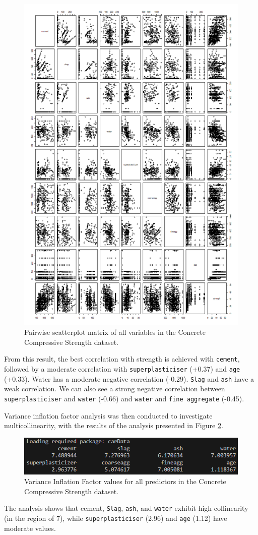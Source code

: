 \documentclass[]{article}
\begin{document}
\begin{figure}[H]
	\centering
	\includegraphics[width=0.5\linewidth]{img/img-pairwise-plot}
	\caption{Pairwise scatterplot matrix of all variables in the Concrete Compressive Strength dataset.}
	\label{fig:img-pairwise-plot}
\end{figure}


From this result, the best correlation with strength is achieved with \texttt{cement}, followed by a moderate correlation with \texttt{superplasticiser} (+0.37) and \texttt{age} (+0.33).
Water has a moderate negative correlation (-0.29). \texttt{Slag} and \texttt{ash} have a weak correlation. We can also see a strong negative correlation between \texttt{superplasticiser} and \texttt{water} (-0.66) and \texttt{water} and \texttt{fine aggregate} (-0.45).


Variance inflation factor analysis was then conducted to investigate multicollinearity, with the results of the analysis presented in Figure \ref{fig:img-vif}.

\begin{figure}
	\centering
	\includegraphics[width=0.7\linewidth]{img/img-vif}
	\caption{Variance Inflation Factor values for all predictors in the Concrete Compressive Strength dataset.}
	\label{fig:img-vif}
\end{figure}



The analysis shows that cement,  \texttt{Slag}, \texttt{ash}, and \texttt{water} exhibit high collinearity (in the region of 7), while \texttt{superplasticiser} (2.96) and  \texttt{age} (1.12) have moderate values.
\end{document}
